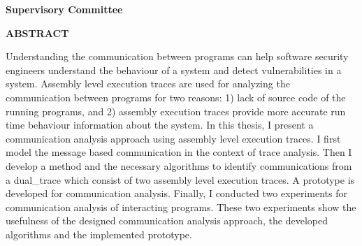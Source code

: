\newpage
{}

\noindent \textbf{Supervisory Committee}
\tpbreak
\panel

\begin{center}
\textbf{ABSTRACT}
\end{center}

Understanding the communication between programs can help software security engineers understand the behaviour of a system and detect vulnerabilities in a system. Assembly level execution traces are used for analyzing the communication between programs for two reasons: 1) lack of source code of the running programs, and 2) assembly execution traces provide more accurate run time behaviour information about the system. In this thesis, I present a communication analysis approach using assembly level execution traces. I first model the message based communication in the context of trace analysis. Then I develop a method and the necessary algorithms to identify communications from a dual\_trace which consist of two assembly level execution traces. A prototype is developed for communication analysis. Finally, I conducted two experiments for communication analysis of interacting programs. These two experiments show the usefulness of the designed communication analysis approach, the developed algorithms and the implemented prototype. 

